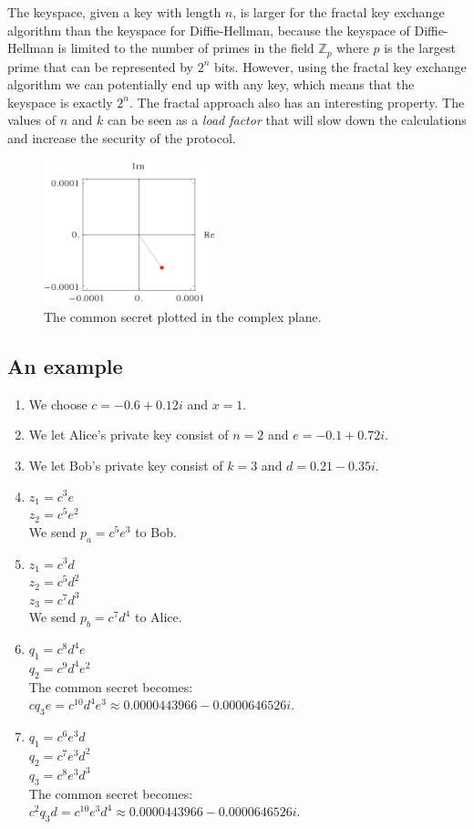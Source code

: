 \documentclass{article}
\begin{document}
The keyspace, given a key with length $n$, is larger for the fractal key exchange algorithm than the keyspace for Diffie-Hellman, because the keyspace of Diffie-Hellman is limited to the number of primes in the field $\mathbb{Z}_{p}$ where $p$ is the largest prime that can be represented by $2^n$ bits. However, using the fractal key exchange algorithm we can potentially end up with any key, which means that the keyspace is exactly $2^n$. The fractal approach also has an interesting property. The values of $n$ and $k$ can be seen as a \textit{load factor} that will slow down the calculations and increase the security of the protocol.
\begin{figure}[hb]
\centering
\includegraphics[width=50mm]{key.png}
\caption{The common secret plotted in the complex plane.}
\end{figure}

\subsection{An example}
\begin{enumerate}
\item We choose $c=-0.6+0.12i$ and $x=1$.
\item We let Alice's private key consist of $n=2$ and $e=-0.1+0.72i$.
\item We let Bob's private key consist of $k=3$ and $d=0.21-0.35i$.
\item $z_{1}=c^3e$\\
$z_{2}=c^5e^2$\\
We send $p_{a}=c^5e^3$ to Bob.
\item $z_{1}=c^3d$\\
$z_{2}=c^5d^2$\\
$z_{3}=c^7d^3$\\
We send $p_{b}=c^7d^4$ to Alice.
\item $q_{1}=c^8d^4e$ \\
$q_{2}=c^9d^4e^2$\\
The common secret becomes:\\ $cq_{3}e=c^{10}d^4e^3\approx 0.0000443966-0.0000646526i$.
\item $q_{1}=c^6e^3d$\\
$q_{2}=c^7e^3d^2$\\
$q_{3}=c^8e^3d^3$\\
The common secret becomes:\\ $c^2q_{3}d=c^{10}e^3d^4\approx 0.0000443966-0.0000646526i$.
\end{enumerate}
\end{document}

